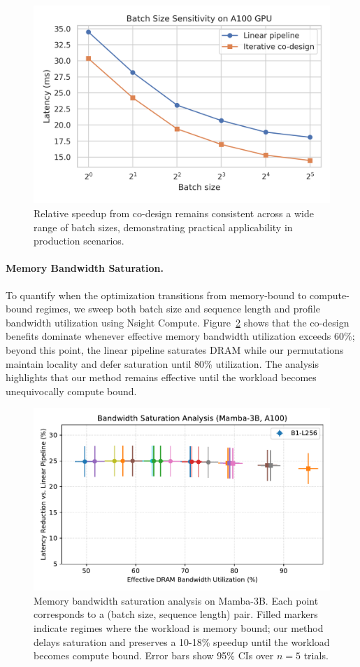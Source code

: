 \documentclass{article}
\begin{document}
\begin{figure}[hbt!]
    \centering
    \includegraphics[width=0.7\linewidth]{figures/batch_size_sensitivity.png} %
    \caption{Relative speedup from co-design remains consistent across a wide range of batch sizes, demonstrating practical applicability in production scenarios.}
    \label{fig:batch_sensitivity}
\end{figure}

\paragraph{Memory Bandwidth Saturation.}
To quantify when the optimization transitions from memory-bound to compute-bound regimes, we sweep both batch size and sequence length and profile bandwidth utilization using Nsight Compute. Figure~\ref{fig:bandwidth_saturation} shows that the co-design benefits dominate whenever effective memory bandwidth utilization exceeds 60\%; beyond this point, the linear pipeline saturates DRAM while our permutations maintain locality and defer saturation until 80\% utilization. The analysis highlights that our method remains effective until the workload becomes unequivocally compute bound.

\begin{figure}[hbt!]
    \centering
    \includegraphics[width=0.75\linewidth]{figures/bandwidth_saturation.pdf}
    \caption{Memory bandwidth saturation analysis on Mamba-3B. Each point corresponds to a (batch size, sequence length) pair. Filled markers indicate regimes where the workload is memory bound; our method delays saturation and preserves a 10-18\% speedup until the workload becomes compute bound. Error bars show 95\% CIs over $n=5$ trials.}
    \label{fig:bandwidth_saturation}
\end{figure}
\end{document}
